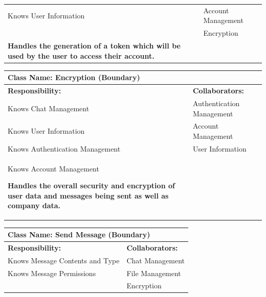 \documentclass[]{article}
\begin{document}
\begin{itemize}
\begin{table}[ht]
\begin{tabular}{|p{7cm}|p{7cm}|}
            Knows User Information & Account Management\\
            & Encryption\\
            
            \vspace{0.1in}
            \textbf{Handles the generation of a token which will be used by the user to access their account.}

		\vspace{1in} & \\
		\hline
  
		\end{tabular}
	\end{table}

	\begin{table}[ht]
		\centering
		\begin{tabular}{|p{7cm}|p{7cm}|}
		\hline 
		 \multicolumn{2}{|l|}{\textbf{Class Name:}  Encryption (Boundary)} \\
		\hline
		\textbf{Responsibility:} & \textbf{Collaborators:} \\
		\hline
            Knows Chat Management & Authentication Management\\
            Knows User Information & Account Management\\
            Knows Authentication Management & User Information\\
            Knows Account Management
            
            \vspace{0.1in}
            \textbf{Handles the overall security and encryption of user data and messages being sent as well as company data.}

		\vspace{1in} & \\
		\hline
  
		\end{tabular}
	\end{table}

	\begin{table}[ht]
		\centering
		\begin{tabular}{|p{7cm}|p{7cm}|}
		\hline 
		 \multicolumn{2}{|l|}{\textbf{Class Name:} Send Message (Boundary)} \\
		\hline
		\textbf{Responsibility:} & \textbf{Collaborators:} \\
		\hline
            Knows Message Contents and Type & Chat Management\\
            Knows Message Permissions & File Management\\
            & Encryption\\
            

\end{tabular}
\end{table}
\end{itemize}
\end{document}
